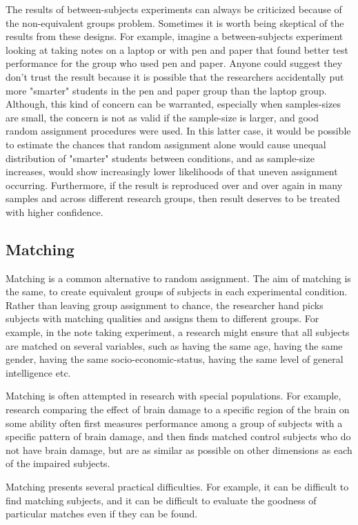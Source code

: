 The results of between-subjects experiments can always be criticized because of the non-equivalent groups problem. Sometimes it is worth being skeptical of the results from these designs. For example, imagine a between-subjects experiment looking at taking notes on a laptop or with pen and paper that found better test performance for the group who used pen and paper. Anyone could suggest they don't trust the result because it is possible that the researchers accidentally put more "smarter" students in the pen and paper group than the laptop group. Although, this kind of concern can be warranted, especially when samples-sizes are small, the concern is not as valid if the sample-size is larger, and good random assignment procedures were used. In this latter case, it would be possible to estimate the chances that random assignment alone would cause unequal distribution of "smarter" students between conditions, and as sample-size increases, would show increasingly lower likelihoods of that uneven assignment occurring. Furthermore, if the result is reproduced over and over again in many samples and across different research groups, then result deserves to be treated with higher confidence.

\subsection{Matching}

Matching is a common alternative to random assignment. The aim of matching is the same, to create equivalent groups of subjects in each experimental condition. Rather than leaving group assignment to chance, the researcher hand picks subjects with matching qualities and assigns them to different groups. For example, in the note taking experiment,  a research might ensure that all subjects are matched on several variables, such as having the same age, having the same gender, having the same socio-economic-status, having the same level of general intelligence etc.

Matching is often attempted in research with special populations. For example, research comparing the effect of brain damage to a specific region of the brain on some ability often first measures performance among a group of subjects with a specific pattern of brain damage, and then finds matched control subjects who do not have brain damage, but are as similar as possible on other dimensions as each of the impaired subjects. 

Matching presents several practical difficulties. For example, it can be difficult to find matching subjects, and it can be difficult to evaluate the goodness of particular matches even if they can be found.

